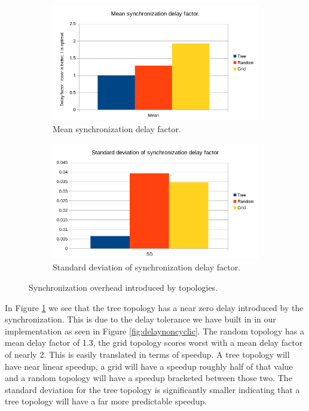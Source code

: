 \begin{figure}
    \centering
    \begin{subfigure}{0.6\textwidth}
    \centering
        \includegraphics[width=0.8\linewidth]{figures/distributeddelaymean.png}
        \caption{Mean synchronization delay factor.}
    \end{subfigure}%
    \begin{subfigure}{0.6\textwidth}
    \centering
        \includegraphics[width=0.8\linewidth]{figures/distributeddelaysd.png}
        \caption{Standard deviation of synchronization delay factor.}
    \end{subfigure}
    \caption{Synchronization overhead introduced by topologies.}
    \label{fig:distributeddelayresults}
    \end{figure}
In Figure \ref{fig:distributeddelayresults} we see that the tree topology has a near zero delay introduced by the synchronization. This is due to the delay tolerance we have built in in our implementation as seen in Figure \ref{fig:delaynoncyclic}. The random topology has a mean delay factor of 1.3, the grid topology scores worst with a mean delay factor of nearly 2. This is easily translated in terms of speedup. A tree topology will have near linear speedup, a grid will have a speedup roughly half of that value and a random topology will have a speedup bracketed between those two. The standard deviation for the tree topology is significantly smaller indicating that a tree topology will have a far more predictable speedup.

